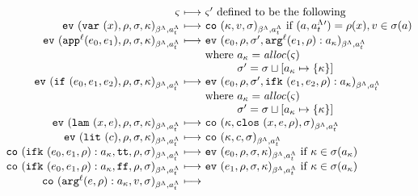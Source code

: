 \documentclass[preprint,onecolumn,9pt]{sigplanconf} %
\begin{document}
\begin{figure*}
  \begin{gather*}
    \begin{array}{@{}r@{\ }c@{\ }l@{}}
      \mstate & \machstep &\mstate' \text{ defined to be the following} \\
      \ev{\svar\mvar, \menv, \msto, \mkont}{\msmlab}{\mstimeline} &\machstep&
      \co{\mkont, \mval, \msto}{\msmlab}{\mstimeline}
      \text{ if } (\maddr, \mstimeline') = \menv(\mvar), \mval \in \msto(\maddr)
      \\
      \ev{\sapp[^\mlab]{\mexpi0}{\mexpi1}, \menv, \msto, \mkont}{\msmlab}{\mstimeline} &\machstep&
      \ev{\mexpi0, \menv, \msto', \spush{\kar[^\mlab]{\mexpi1, \menv}}{\mkaddr}}{\msmlab}{\mstimeline}
      \\
      &&\text{where } \mkaddr = \alloc(\mstate) \\
      &&\phantom{\text{where }} \msto' = \ext{\msto}{\mkaddr}{\setof{\mkont}} \\
      \ev{\sif{\mexpi0}{\mexpi1}{\mexpi2}, \menv, \msto, \mkont}{\msmlab}{\mstimeline} &\machstep&
      \ev{\mexpi0, \menv, \msto', \spush{\kif{\mexpi1, \mexpi2, \menv}}{\mkaddr}}{\msmlab}{\mstimeline} \\
      &&\text{where } \mkaddr = \alloc(\mstate) \\
      &&\phantom{\text{where }} \msto' = \ext{\msto}{\mkaddr}{\setof{\mkont}} \\
      \ev{\slam{\mvar}{\mexp}, \menv, \msto, \mkont}{\msmlab}{\mstimeline} &\machstep&
      \co{\mkont, \clos{\mvar, \mexp, \menv}, \msto}{\msmlab}{\mstimeline}
      \\
      \ev{\slit{\mconstant}, \menv, \msto, \mkont}{\msmlab}{\mstimeline} &\machstep&
      \co{\mkont, \mconstant, \msto}{\msmlab}{\mstimeline}
      \\
      \co{\spush{\kif{\mexpi0, \mexpi1, \menv}}{\mkaddr}, \strue, \menv, \msto}{\msmlab}{\mstimeline} &\machstep&
      \ev{\mexpi0, \menv, \msto, \mkont}{\msmlab}{\mstimeline} \text{ if } \mkont \in \msto(\mkaddr)
      \\
      \co{\spush{\kif{\mexpi0, \mexpi1, \menv}}{\mkaddr}, \sfalse, \menv, \msto}{\msmlab}{\mstimeline} &\machstep&
      \ev{\mexpi1, \menv, \msto, \mkont}{\msmlab}{\mstimeline} \text{ if } \mkont \in \msto(\mkaddr)
      \\
      \co{\spush{\kar[^\mlab]{\mexp, \menv}}{\mkaddr}, \mval, \msto}{\msmlab}{\mstimeline} &\machstep&

\end{array}
\end{gather*}
\end{figure*}
\end{document}
